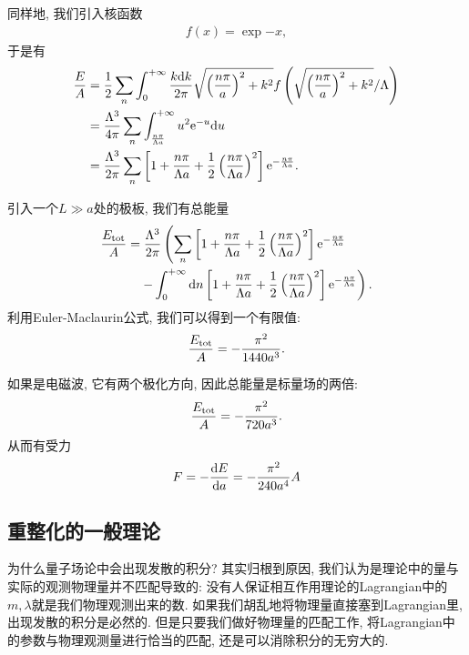 同样地, 我们引入核函数
\begin{align}
    f(x)=\exp{-x}, 
\end{align}
于是有
\begin{align}
    \frac EA&=\frac12\sum_n\int_0^{+\infty}\frac{k\d k}{2\pi}\sqrt{\left(\frac{n\pi}a\right)^2+k^2}f\left({\sqrt{\left(\frac{n\pi}a\right)^2+k^2}}/\Lambda\right)\\
    &=\frac{\Lambda^3}{4\pi}\sum_n\int_{\frac{n\pi}{\Lambda a}}^{+\infty}u^2\exp{-u}\d u\\
    &=\frac{\Lambda^3}{2\pi}\sum_n\left[1+\frac{n\pi}{\Lambda a}+\frac12\left(\frac{n\pi}{\Lambda a}\right)^2\right]\exp{-\frac{n\pi}{\Lambda a}}.
\end{align}

引入一个$L\gg a$处的极板, 我们有总能量
\begin{align}
    \frac{E_{\rm{tot}}}A&=\frac{\Lambda^3}{2\pi}\left(\sum_n\left[1+\frac{n\pi}{\Lambda a}+\frac12\left(\frac{n\pi}{\Lambda a}\right)^2\right]\exp{-\frac{n\pi}{\Lambda a}}\right.\notag\\
    &\quad\left.-\int_0^{+\infty}\d n\left[1+\frac{n\pi}{\Lambda a}+\frac12\left(\frac{n\pi}{\Lambda a}\right)^2\right]\exp{-\frac{n\pi}{\Lambda a}}\right).
\end{align}
利用Euler-Maclaurin公式, 我们可以得到一个有限值:
\begin{align}
    \frac{E_{\rm{tot}}}A=-\frac{\pi^2}{1440a^3}.
\end{align}

如果是电磁波, 它有两个极化方向, 因此总能量是标量场的两倍:
\begin{align}
    \frac{E_{\rm{tot}}}A=-\frac{\pi^2}{720a^3}.
\end{align}
从而有受力
\begin{align}
    F=-\de Ea=-\frac{\pi^2}{240a^4}A
\end{align}

\subsection{重整化的一般理论}
为什么量子场论中会出现发散的积分? 其实归根到原因, 我们认为是理论中的量与实际的观测物理量并不匹配导致的: 没有人保证相互作用理论的Lagrangian中的$m, \lambda$就是我们物理观测出来的数. 如果我们胡乱地将物理量直接塞到Lagrangian里, 出现发散的积分是必然的. 但是只要我们做好物理量的匹配工作, 将Lagrangian中的参数与物理观测量进行恰当的匹配, 还是可以消除积分的无穷大的. 

